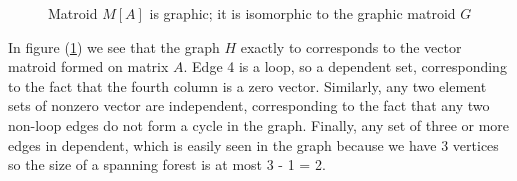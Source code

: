 
\begin{figure}[H]
    \centering
    \qquad
    \caption{Matroid $M[A]$ is graphic; it is isomorphic to the graphic matroid $G$}%
    \label{graphicmatrix}%
\end{figure}

In figure (\ref{graphicmatrix}) we see that the graph $H$ exactly to corresponds to the vector matroid formed on matrix $A$. Edge 4 is a loop, so a dependent set, corresponding to the fact that the fourth column is a zero vector. Similarly, any two element sets of nonzero vector are independent, corresponding to the fact that any two non-loop edges do not form a cycle in the graph. Finally, any set of three or more edges in dependent, which is easily seen in the graph because we have 3 vertices so the size of a spanning forest is at most 3 - 1 = 2.


